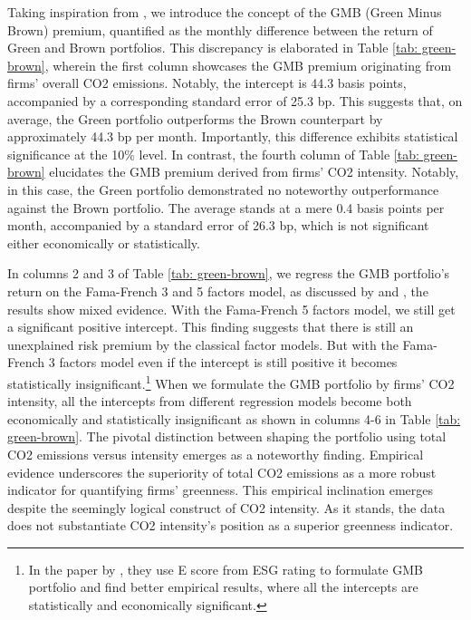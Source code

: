 \documentclass[12pt]{article}
\begin{document}
Taking inspiration from \cite{pastor2022dissecting}, we introduce the concept of the GMB (Green Minus Brown) premium, quantified as the monthly difference between the return of Green and Brown portfolios. This discrepancy is elaborated in Table \ref{tab: green-brown}, wherein the first column showcases the GMB premium originating from firms' overall CO2 emissions. Notably, the intercept is 44.3 basis points, accompanied by a corresponding standard error of 25.3 bp. This suggests that, on average, the Green portfolio outperforms the Brown counterpart by approximately 44.3 bp per month. Importantly, this difference exhibits statistical significance at the 10\% level. In contrast, the fourth column of Table \ref{tab: green-brown} elucidates the GMB premium derived from firms' CO2 intensity. Notably, in this case, the Green portfolio demonstrated no noteworthy outperformance against the Brown portfolio. The average stands at a mere 0.4 basis points per month, accompanied by a standard error of 26.3 bp, which is not significant either economically or statistically. 

In columns 2 and 3 of Table \ref{tab: green-brown}, we regress the GMB portfolio's return on the Fama-French 3 and 5 factors model, as discussed by \cite{fama2015five} and \cite{fama1993common}, the results show mixed evidence. With the Fama-French 5 factors model, we still get a significant positive intercept. This finding suggests that there is still an unexplained risk premium by the classical factor models. But with the Fama-French 3 factors model even if the intercept is still positive it becomes statistically insignificant.\footnote{In the paper by \cite{pastor2022dissecting}, they use E score from ESG rating to formulate GMB portfolio and find better empirical results, where all the intercepts are statistically and economically significant.} When we formulate the GMB portfolio by firms' CO2 intensity, all the intercepts from different regression models become both economically and statistically insignificant as shown in columns 4-6 in Table \ref{tab: green-brown}. The pivotal distinction between shaping the portfolio using total CO2 emissions versus intensity emerges as a noteworthy finding. Empirical evidence underscores the superiority of total CO2 emissions as a more robust indicator for quantifying firms' greenness. This empirical inclination emerges despite the seemingly logical construct of CO2 intensity. As it stands, the data does not substantiate CO2 intensity's position as a superior greenness indicator.
\end{document}
